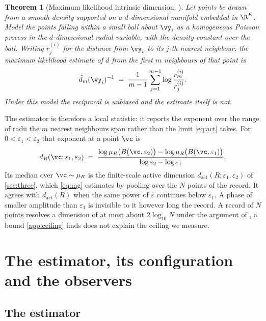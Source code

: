 \documentclass{article}
\newtheorem{theorem}{Theorem}
\begin{document}
\begin{theorem}[Maximum likelihood intrinsic dimension;
\citealp{levina2004maximum, mackay2005comments}]\label{thm:lb}
Let points be drawn from a smooth density supported on a $d$-dimensional manifold embedded in
$\R^{E}$. Model the points falling within a small ball about $\vy_i$ as a homogeneous Poisson
process in the $d$-dimensional radial variable, with the density constant over the ball. Writing
$r^{(i)}_j$ for the distance from $\vy_i$ to its $j$-th nearest neighbour, the maximum likelihood
estimate of $d$ from the first $m$ neighbours of that point is
\begin{equation}\label{eq:lbpoint}
  \hat{d}_m(\vy_i)^{-1} \;=\; \frac{1}{m-1} \sum_{j=1}^{m-1} \log \frac{r^{(i)}_m}{r^{(i)}_j} .
\end{equation}
Under this model the reciprocal is unbiased and the estimate itself is not.
\end{theorem}

The estimator is therefore a local statistic: it reports the exponent over the range of radii the
$m$ nearest neighbours span rather than the limit \cref{eq:act} takes. For
$0 < \varepsilon_1 < \varepsilon_2$ that exponent at a point $\vc$ is
\begin{equation}\label{eq:finitescale}
  d_R(\vc; \varepsilon_1, \varepsilon_2) \;=\;
  \frac{\log \mu_R\bigl(B(\vc, \varepsilon_2)\bigr)
        - \log \mu_R\bigl(B(\vc, \varepsilon_1)\bigr)}
       {\log \varepsilon_2 - \log \varepsilon_1} .
\end{equation}
Its median over $\vc \sim \mu_R$ is the finite-scale active dimension
$d_{\mathrm{act}}(R; \varepsilon_1, \varepsilon_2)$ of \cref{sec:three}, which \cref{eq:mg}
estimates by pooling over the $N$ points of the record. It agrees with $d_{\mathrm{act}}(R)$ when
the same power of $\varepsilon$ continues below $\varepsilon_1$. A phase of smaller amplitude than
$\varepsilon_1$ is invisible to it however long the record. A record of $N$ points resolves a dimension of at most about
$2 \log_{10} N$ under the argument of \citet{eckmann1992fundamental}, a bound \cref{app:ceiling}
finds does not explain the ceiling we measure.

\section{The estimator, its configuration and the observers}\label{app:method}

\subsection{The estimator}\label{app:alg}
\end{document}
